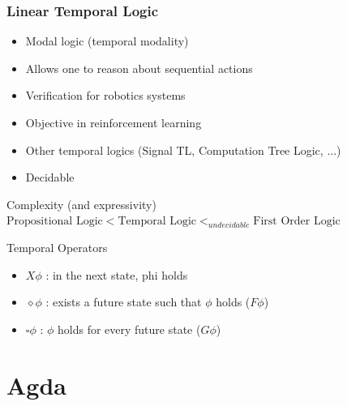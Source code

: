 \documentclass{beamer}
\begin{document}
\begin{frame}
\frametitle{Linear Temporal Logic}
\begin{itemize}
\item Modal logic (temporal modality)
\item Allows one to reason about sequential actions
\item Verification for robotics systems
\item Objective in reinforcement learning
\item Other temporal logics (Signal TL, Computation Tree Logic, ...)
\item Decidable 
\end{itemize}

\begin{block}{Complexity (and expressivity)}
$\text{Propositional Logic} < \text{Temporal Logic} <_{undecidable} \text{First Order Logic}$
\end{block}

\begin{exampleblock}{Temporal Operators}
\begin{itemize}
\item $X \phi$ : in the next state, phi holds
\item $\diamond \phi$ : exists a future state such that $\phi$ holds ($F \phi$)
\item $\square \phi$ : $\phi$ holds for every future state ($G \phi$)
\end{itemize}
\end{exampleblock}

\end{frame}

\section{Agda}

\begin{frame}

\end{frame}

\begin{frame}

\end{frame}

\begin{frame}

\end{frame}

\begin{frame}

\end{frame}
\end{document}
